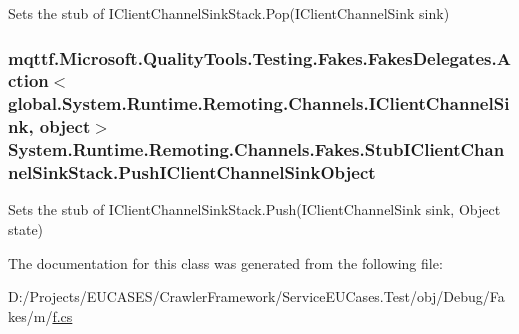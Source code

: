 Sets the stub of I\-Client\-Channel\-Sink\-Stack.\-Pop(\-I\-Client\-Channel\-Sink sink)

\hypertarget{class_system_1_1_runtime_1_1_remoting_1_1_channels_1_1_fakes_1_1_stub_i_client_channel_sink_stack_a0e3deddd374ff2b97ff7fa72d1f01b1b}{
\subsubsection[{Push\-I\-Client\-Channel\-Sink\-Object}]{\setlength{\rightskip}{0pt plus 5cm}mqttf.\-Microsoft.\-Quality\-Tools.\-Testing.\-Fakes.\-Fakes\-Delegates.\-Action$<$global.\-System.\-Runtime.\-Remoting.\-Channels.\-I\-Client\-Channel\-Sink, object$>$ System.\-Runtime.\-Remoting.\-Channels.\-Fakes.\-Stub\-I\-Client\-Channel\-Sink\-Stack.\-Push\-I\-Client\-Channel\-Sink\-Object}}\label{class_system_1_1_runtime_1_1_remoting_1_1_channels_1_1_fakes_1_1_stub_i_client_channel_sink_stack_a0e3deddd374ff2b97ff7fa72d1f01b1b}


Sets the stub of I\-Client\-Channel\-Sink\-Stack.\-Push(\-I\-Client\-Channel\-Sink sink, Object state)



The documentation for this class was generated from the following file\-:\begin{DoxyCompactItemize}
\item 
D\-:/\-Projects/\-E\-U\-C\-A\-S\-E\-S/\-Crawler\-Framework/\-Service\-E\-U\-Cases.\-Test/obj/\-Debug/\-Fakes/m/\hyperlink{m_2f_8cs}{f.\-cs}\end{DoxyCompactItemize}
